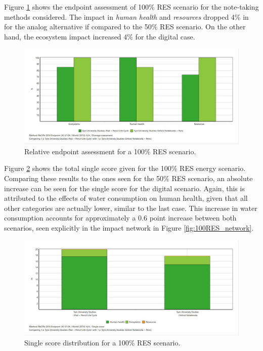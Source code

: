 Figure \ref{fig:damage_assessment_RES_100} shows the endpoint assessment of 100\% RES scenario for the note-taking methods considered. The impact in \textit{human health} and \textit{resources} dropped 4\% in for the analog alternative if compared to the 50\% RES scenario. On the other hand, the ecosystem impact increased 4\% for the digital case.

\begin{figure}[H]
    \centering
    \includegraphics[width=\textwidth]{images/RES_100/Damage_Assessment_RES_100.JPG}
    \caption{Relative endpoint assessment for a 100\% RES scenario.}\label{fig:damage_assessment_RES_100}
\end{figure}

Figure \ref{fig:single_score_RES100} shows the total single score given for the 100\% RES energy scenario. Comparing these results to the ones seen for the 50\% RES scenario, an absolute increase can be seen for the single score for the digital scenario. Again, this is attributed to the effects of water consumption on human health, given that all other categories are actually lower, similar to the last case. This increase in water consumption accounts for approximately a 0.6 point increase between both scenarios, seen explicitly in the impact network in Figure \ref{fig:100RES_network}.

\begin{figure}[H]
    \centering
    \includegraphics[width=\textwidth]{images/RES_100/Single_Score_RES_100.JPG}
    \caption{Single score distribution for a 100\% RES scenario.}\label{fig:single_score_RES100}
\end{figure}

